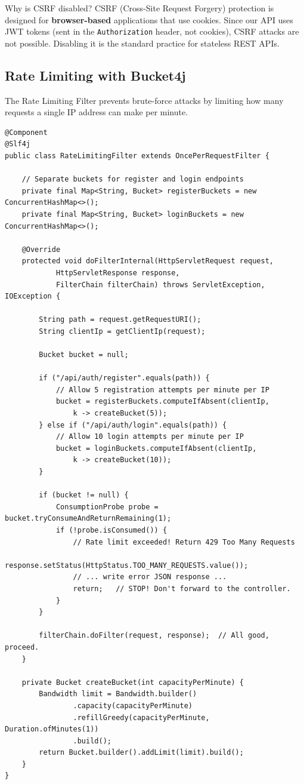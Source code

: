 \documentclass[11pt, a4paper]{article}
\begin{document}
\begin{warningbox}{Why is CSRF disabled?}
CSRF (Cross-Site Request Forgery) protection is designed for \textbf{browser-based} applications that use cookies. Since our API uses JWT tokens (sent in the \texttt{Authorization} header, not cookies), CSRF attacks are not possible. Disabling it is the standard practice for stateless REST APIs.
\end{warningbox}

\subsection{Rate Limiting with Bucket4j}

The Rate Limiting Filter prevents brute-force attacks by limiting how many requests a single IP address can make per minute.

\begin{lstlisting}[caption={RateLimitingFilter.java -- Token Bucket Algorithm}]
@Component
@Slf4j
public class RateLimitingFilter extends OncePerRequestFilter {

    // Separate buckets for register and login endpoints
    private final Map<String, Bucket> registerBuckets = new ConcurrentHashMap<>();
    private final Map<String, Bucket> loginBuckets = new ConcurrentHashMap<>();

    @Override
    protected void doFilterInternal(HttpServletRequest request,
            HttpServletResponse response,
            FilterChain filterChain) throws ServletException, IOException {

        String path = request.getRequestURI();
        String clientIp = getClientIp(request);

        Bucket bucket = null;

        if ("/api/auth/register".equals(path)) {
            // Allow 5 registration attempts per minute per IP
            bucket = registerBuckets.computeIfAbsent(clientIp,
                k -> createBucket(5));
        } else if ("/api/auth/login".equals(path)) {
            // Allow 10 login attempts per minute per IP
            bucket = loginBuckets.computeIfAbsent(clientIp,
                k -> createBucket(10));
        }

        if (bucket != null) {
            ConsumptionProbe probe = bucket.tryConsumeAndReturnRemaining(1);
            if (!probe.isConsumed()) {
                // Rate limit exceeded! Return 429 Too Many Requests
                response.setStatus(HttpStatus.TOO_MANY_REQUESTS.value());
                // ... write error JSON response ...
                return;   // STOP! Don't forward to the controller.
            }
        }

        filterChain.doFilter(request, response);  // All good, proceed.
    }

    private Bucket createBucket(int capacityPerMinute) {
        Bandwidth limit = Bandwidth.builder()
                .capacity(capacityPerMinute)
                .refillGreedy(capacityPerMinute, Duration.ofMinutes(1))
                .build();
        return Bucket.builder().addLimit(limit).build();
    }
}
\end{lstlisting}
\end{document}

